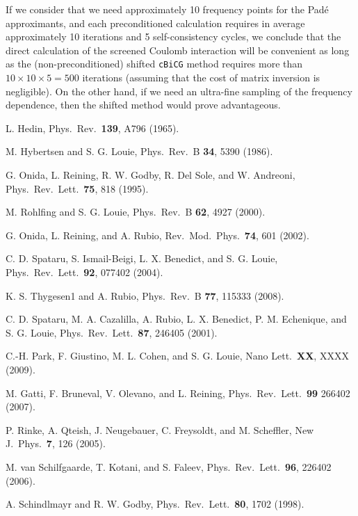 \documentclass[twocolumn,prb,showpacs,superscriptaddress]{revtex4}
\begin{document}
If we consider that we need approximately 10 frequency points for the
Pad\'e approximants, and each preconditioned calculation requires
in average approximately 10 iterations and 5 self-consistency cycles, 
we conclude that the direct calculation of the screened Coulomb interaction
will be convenient as long as the (non-preconditioned)
shifted {\tt cBiCG} method requires more than $10\times10\times5=500$ 
iterations (assuming that the cost of matrix inversion is negligible).
On the other hand, if we need an ultra-fine sampling of the frequency
dependence, then the shifted method would prove advantageous.

\begin{thebibliography}{99}

L. Hedin,
Phys.\ Rev.\ {\bf 139}, A796 (1965).

M. Hybertsen and S. G. Louie,
Phys.\ Rev.\ B {\bf 34}, 5390 (1986).

G. Onida, L. Reining, R. W. Godby, R. Del Sole, and W. Andreoni, 
Phys.\ Rev.\ Lett.\ {\bf 75}, 818 (1995).

M. Rohlfing and S. G. Louie,
Phys.\ Rev.\ B {\bf 62}, 4927 (2000).

G. Onida, L. Reining, and A. Rubio,
Rev.\ Mod.\ Phys.\ {\bf 74}, 601 (2002).

C. D. Spataru, S. Ismail-Beigi, L. X. Benedict, and S. G. Louie,
Phys.\ Rev.\ Lett.\ {\bf 92}, 077402 (2004).

K. S. Thygesen1 and A. Rubio,
Phys.\ Rev.\ B {\bf 77}, 115333 (2008).

C. D. Spataru, M. A. Cazalilla, A. Rubio, L. X. Benedict, P. M. Echenique, and S. G. Louie,
Phys.\ Rev.\ Lett.\ {\bf 87}, 246405 (2001).

C.-H. Park, F. Giustino, M. L. Cohen, and S. G. Louie,
Nano Lett.\ {\bf XX}, XXXX (2009).

M. Gatti, F. Bruneval, V. Olevano, and L. Reining,
Phys.\ Rev.\ Lett.\ {\bf 99} 266402 (2007).

P. Rinke, A. Qteish, J. Neugebauer, C. Freysoldt, and M. Scheffler, 
New J.\ Phys.\ {\bf 7}, 126 (2005). 

M. van Schilfgaarde, T. Kotani, and S. Faleev,
Phys.\ Rev.\ Lett.\ {\bf 96}, 226402 (2006).

A. Schindlmayr and R. W. Godby,
Phys.\ Rev.\ Lett.\ {\bf 80}, 1702 (1998).


\end{thebibliography}
\end{document}
